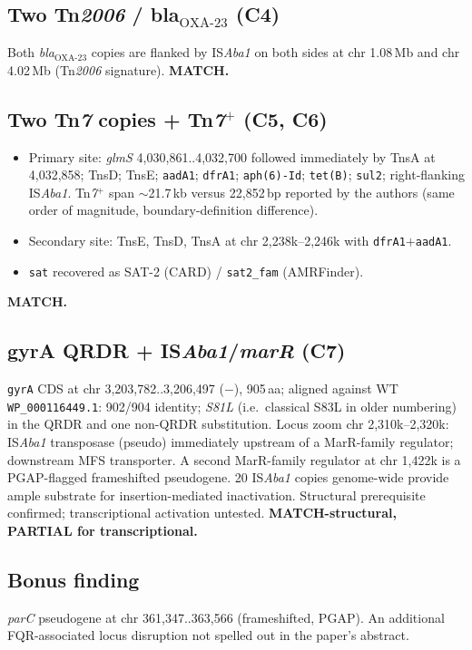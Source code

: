 \documentclass[11pt]{article}
\begin{document}
\subsection{Two Tn\emph{2006} / bla$_{\text{OXA-23}}$ (C4)}
Both \emph{bla}$_{\text{OXA-23}}$ copies are flanked by IS\emph{Aba1}
on both sides at chr 1.08\,Mb and chr 4.02\,Mb (Tn\emph{2006}
signature).  \textbf{MATCH.}

\subsection{Two Tn\emph{7} copies + Tn\emph{7}$^{+}$ (C5, C6)}
\begin{itemize}[nosep]
  \item Primary site: \emph{glmS} 4{,}030{,}861..4{,}032{,}700 followed
        immediately by TnsA at 4{,}032{,}858; TnsD; TnsE; \texttt{aadA1};
        \texttt{dfrA1}; \texttt{aph(6)-Id}; \texttt{tet(B)};
        \texttt{sul2}; right-flanking IS\emph{Aba1}.
        Tn\emph{7}$^{+}$ span $\sim$21.7\,kb versus 22{,}852\,bp
        reported by the authors (same order of magnitude, boundary-definition
        difference).
  \item Secondary site: TnsE, TnsD, TnsA at chr 2{,}238k--2{,}246k with
        \texttt{dfrA1}$+$\texttt{aadA1}.
  \item \texttt{sat} recovered as SAT-2 (CARD) / \texttt{sat2\_fam}
        (AMRFinder).
\end{itemize}
\textbf{MATCH.}

\subsection{gyrA QRDR + IS\emph{Aba1}/\emph{marR} (C7)}
\texttt{gyrA} CDS at chr 3{,}203{,}782..3{,}206{,}497 ($-$), 905\,aa;
aligned against WT \texttt{WP\_000116449.1}: 902/904 identity;
\emph{S81L} (i.e.\ classical S83L in older numbering) in the QRDR and
one non-QRDR substitution.
Locus zoom chr 2{,}310k--2{,}320k: IS\emph{Aba1} transposase (pseudo)
immediately upstream of a MarR-family regulator; downstream MFS
transporter.  A second MarR-family regulator at chr 1{,}422k is a
PGAP-flagged frameshifted pseudogene.  20 IS\emph{Aba1} copies
genome-wide provide ample substrate for insertion-mediated inactivation.
Structural prerequisite confirmed; transcriptional activation
untested.  \textbf{MATCH-structural, PARTIAL for transcriptional.}

\subsection{Bonus finding}
\emph{parC} pseudogene at chr 361{,}347..363{,}566 (frameshifted, PGAP).
An additional FQR-associated locus disruption not spelled out in the
paper's abstract.
\end{document}
